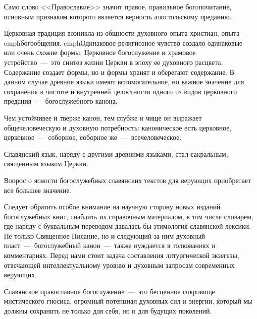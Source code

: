 \documentclass[11pt,a4paper,oneside]{memoir}
\begin{document}
    Само слово <<Православие>> значит правое, правильное богопочитание, основным признаком которого является верность апостольскому преданию.
    
    Церковная традиция возникла из общности духовного опыта христиан, опыта emph{богообщения}. emph{Одинаковое религиозное чувство создало} одинаковые или очень схожие формы. Церковное богослужение и храмовое устройство~---~это синтез жизни Церкви в эпоху ее духовного расцвета. Содержание создает формы, но и формы хранят и оберегают содержание. В данном случае древние языки имеют вспомогательное, но важное значение для сохранения в чистоте и внутренней целостности одного из видов церковного предания~---~богослужебного канона.
    
    Чем устойчивее и тверже канон, тем глубже и чище он выражает общечеловеческую и духовную потребность: каноническое есть церковное, церковное~---~соборное, соборное же~---~всечеловеческое.
    
    Славянский язык, наряду с другими древними языками, стал сакральным, священным языком Церкви.
    
    Вопрос о ясности богослужебных славянских текстов для верующих приобретает все большее значение.
    
    Следует обратить особое внимание на научную сторону новых изданий богослужебных книг, снабдить их справочным материалом, в том числе словарем, где наряду с буквальным переводом давалась бы этимология славянской лексики. Не только Священное Писание, но и следующий за ним духовный пласт~---~богослужебный канон~---~также нуждается в толкованиях и комментариях. Перед нами стоит задача составления литургической экзегезы, отвечающей интеллектуальному уровню и духовным запросам современных верующих.
    
    Славянское православное богослужение~---~это бесценное сокровище мистического гносиса, огромный потенциал духовных сил и энергии, который мы должны сохранить не только для себя, но и для будущих поколений.
    
\end{document}
